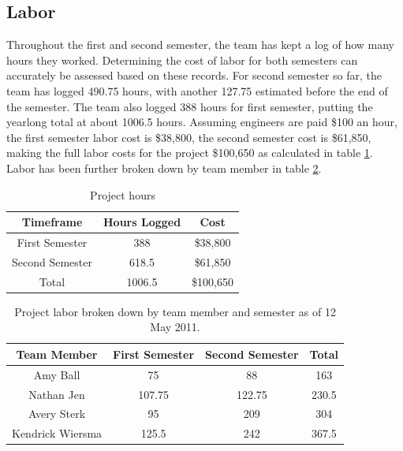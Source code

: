 \subsection{Labor}
Throughout the first and second semester, the team has kept a log of how many hours they worked. Determining the cost of labor for both semesters can accurately be assessed based on these records. For second semester so far, the team has logged 490.75 hours, with another 127.75 estimated before the end of the semester. The team also logged 388 hours for first semester, putting the yearlong total at about 1006.5 hours. Assuming engineers are paid \$100 an hour, the first semester labor cost is \$38,800, the second semester cost is \$61,850, making the full labor costs for the project \$100,650 as calculated in table \ref{tab:projecthours}. Labor has been further broken down by team member in table \ref{tab:teamprojecthours}.
\begin{table}[htbp]
  \centering
  \begin{tabular}{|c|c|c|}\hline
    \textbf{Timeframe} & \textbf{Hours Logged} & \textbf{Cost}\\\hline\hline
    First Semester     & 388                   & \$38,800\\\hline
    Second Semester    & 618.5                 & \$61,850\\\hline
    Total              & 1006.5                & \$100,650\\\hline
  \end{tabular}
  \caption{Project hours}
  \label{tab:projecthours}
\end{table}

\begin{table}[htbp]
  \centering
  \begin{tabular}{|c|c|c|c|}\hline
    Team Member      & First Semester & Second Semester & Total\\\hline\hline
    Amy Ball         & 75             & 88              & 163\\\hline
    Nathan Jen       & 107.75         & 122.75          & 230.5\\\hline
    Avery Sterk      & 95             & 209             & 304\\\hline
    Kendrick Wiersma & 125.5          & 242             & 367.5\\\hline
  \end{tabular}
  \caption{Project labor broken down by team member and semester as of 12 May 2011.}
  \label{tab:teamprojecthours}
\end{table}

